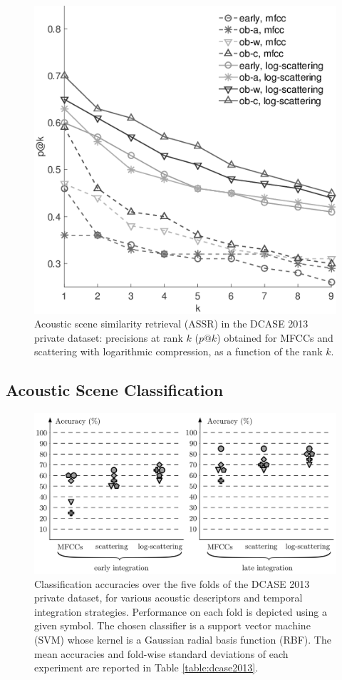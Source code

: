 \documentclass[journal]{IEEEtran}
\begin{document}
\begin{figure}[t]
\begin{center}
\includegraphics[width=.9\columnwidth]{bw/unsupervised_test2}
\caption{Acoustic scene similarity retrieval (ASSR) in the DCASE 2013 private dataset: precisions at rank $k$ ($p@k$) obtained for MFCCs and scattering with logarithmic compression, as a function of the rank $k$.}
\label{fig:ASS_1}
\end{center}
\end{figure}

\subsection{Acoustic Scene Classification}


\begin{figure}
\begin{center}
\includegraphics[width=\columnwidth]{bw/folds.png}
\caption{\label{fig:folds}
Classification accuracies over the five folds of the DCASE 2013 private dataset, for various acoustic descriptors and temporal integration strategies.  Performance on each fold is depicted using a given symbol.
The chosen classifier is a support vector machine (SVM) whose kernel is a Gaussian radial basis function (RBF).
The mean accuracies and fold-wise standard deviations of each experiment are reported in Table \ref{table:dcase2013}.}
\end{center}
\end{figure}
\end{document}

